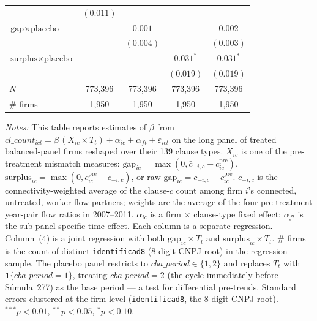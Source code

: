 \begin{table}[H]
\begin{tabular}{lcccc}
 & $(0.011)$ &  &  &  \\
$\text{gap} \times \text{placebo}$ &  & $0.001$ &  & $0.002$ \\
 &  & $(0.004)$ &  & $(0.003)$ \\
$\text{surplus} \times \text{placebo}$ &  &  & $0.031^{*}$ & $0.031^{*}$ \\
 &  &  & $(0.019)$ & $(0.019)$ \\
$N$ & 773,396 & 773,396 & 773,396 & 773,396 \\
\# firms & 1,950 & 1,950 & 1,950 & 1,950 \\
\bottomrule
\end{tabular}
\begin{minipage}{\linewidth}
\footnotesize\vspace{4pt}
\textit{Notes:} This table reports estimates of $\beta$ from $cl\_count_{ict} = \beta\,(X_{ic} \times T_t) + \alpha_{ic} + \alpha_{ft} + \varepsilon_{ict}$ on the long panel of treated balanced-panel firms reshaped over their 139 clause types. $X_{ic}$ is one of the pre-treatment mismatch measures: $\text{gap}_{ic} = \max(0, \bar{c}_{-i,c} - c^{\text{pre}}_{ic})$, $\text{surplus}_{ic} = \max(0, c^{\text{pre}}_{ic} - \bar{c}_{-i,c})$, or $\text{raw\_gap}_{ic} = \bar{c}_{-i,c} - c^{\text{pre}}_{ic}$. $\bar{c}_{-i,c}$ is the connectivity-weighted average of the clause-$c$ count among firm $i$'s connected, untreated, worker-flow partners; weights are the average of the four pre-treatment year-pair flow ratios in 2007--2011. $\alpha_{ic}$ is a firm $\times$ clause-type fixed effect; $\alpha_{ft}$ is the sub-panel-specific time effect. Each column is a separate regression. Column~(4) is a joint regression with both $\text{gap}_{ic} \times T_t$ and $\text{surplus}_{ic} \times T_t$. \# firms is the count of distinct \texttt{identificad8} (8-digit CNPJ root) in the regression sample. The placebo panel restricts to $cba\_period \in \{1, 2\}$ and replaces $T_t$ with $\mathbf{1}\{cba\_period = 1\}$, treating $cba\_period = 2$ (the cycle immediately before Súmula~277) as the base period — a test for differential pre-trends. Standard errors clustered at the firm level (\texttt{identificad8}, the 8-digit CNPJ root). $^{***}p<0.01$, $^{**}p<0.05$, $^{*}p<0.10$.
\end{minipage}
\end{table}

